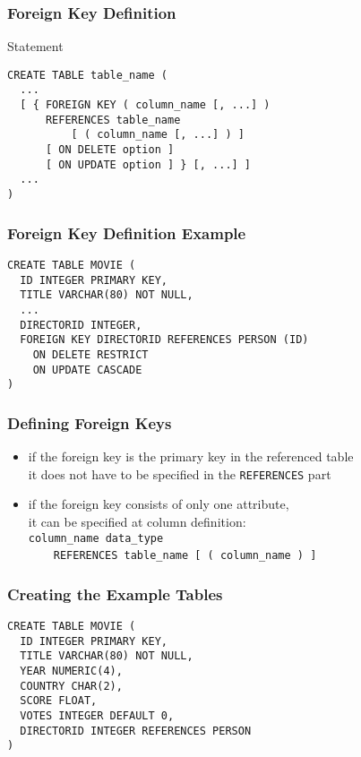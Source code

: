\documentclass[dvipsnames]{beamer}
\theoremstyle{plain}
\begin{document}
\begin{frame}[fragile]
  \frametitle{Foreign Key Definition}

  \begin{block}{Statement}
    \begin{lstlisting}
CREATE TABLE table_name (
  ...
  [ { FOREIGN KEY ( column_name [, ...] )
      REFERENCES table_name
          [ ( column_name [, ...] ) ]
      [ ON DELETE option ]
      [ ON UPDATE option ] } [, ...] ]
  ...
)
    \end{lstlisting}
  \end{block}
\end{frame}

\begin{frame}[fragile]
  \frametitle{Foreign Key Definition Example}

  \begin{example}
    \begin{lstlisting}
CREATE TABLE MOVIE (
  ID INTEGER PRIMARY KEY,
  TITLE VARCHAR(80) NOT NULL,
  ...
  DIRECTORID INTEGER,
  FOREIGN KEY DIRECTORID REFERENCES PERSON (ID)
    ON DELETE RESTRICT
    ON UPDATE CASCADE
)
    \end{lstlisting}
  \end{example}
\end{frame}

\begin{frame}[fragile]
  \frametitle{Defining Foreign Keys}

  \begin{itemize}
    \item if the foreign key is the primary key in the referenced table\\
      it does not have to be specified in the \lstinline!REFERENCES! part

    \pause
    \item if the foreign key consists of only one attribute,\\
      it can be specified at column definition:\\
      \lstinline!column_name data_type!\\
      ~~~~\lstinline!REFERENCES table_name [ ( column_name ) ]!
  \end{itemize}
\end{frame}

\begin{frame}[fragile]
  \frametitle{Creating the Example Tables}

  \begin{example}
    \begin{lstlisting}
CREATE TABLE MOVIE (
  ID INTEGER PRIMARY KEY,
  TITLE VARCHAR(80) NOT NULL,
  YEAR NUMERIC(4),
  COUNTRY CHAR(2),
  SCORE FLOAT,
  VOTES INTEGER DEFAULT 0,
  DIRECTORID INTEGER REFERENCES PERSON
)
    \end{lstlisting}
  \end{example}
\end{frame}
\end{document}
